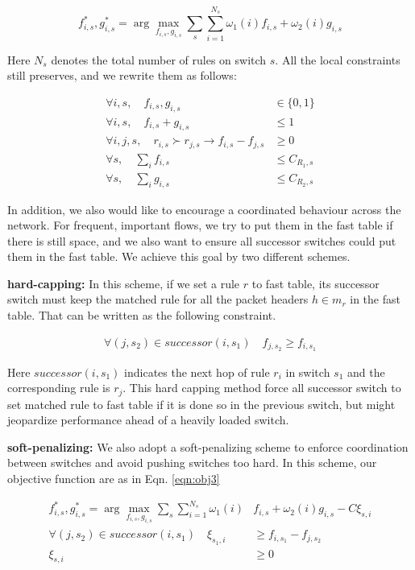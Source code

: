 \documentclass[10pt,twocolumn,letterpaper]{article}
\begin{document}
\begin{equation}
f_{i,s}^*,g_{i,s}^*=\arg\max_{f_{i,s},g_{i,s}} \sum_{s}\sum_{i=1}^{N_s} \omega_1(i)f_{i,s} + \omega_2(i)g_{i,s} \label{eqn:obj2}
\end{equation}

Here $N_s$ denotes the total number of rules on switch $s$. All the local constraints still preserves, and we rewrite them as follows:

\begin{align}
\label{eqn:con1b}\forall i,s, \quad f_{i,s}, g_{i,s} &\in \{0,1\} \\
\label{eqn:con2b}\forall i,s, \quad  f_{i,s}+g_{i,s} &\leq 1 \\
\label{eqn:con3b}\forall i,j,s, \quad  r_{i,s} \succ r_{j,s} \to f_{i,s}-f_{j,s} &\geq 0 \\
\label{eqn:con4b}\forall s, \quad  \sum_i f_{i,s} &\leq C_{R_1,s} \\
\label{eqn:con5b}\forall s, \quad  \sum_i g_{i,s} &\leq C_{R_2,s}
\end{align}

In addition, we also would like to encourage a coordinated behaviour across the network. For frequent, important flows, we try to put them in the fast table if there is still space, and we also want to ensure all successor switches could put them in the fast table. We achieve this goal by two different schemes.

\textbf{hard-capping:} In this scheme, if we set a rule $r$ to fast table, its successor switch must keep the matched rule for all the packet headers $h \in m_r$ in the fast table. That can be written as the following constraint.

\begin{align}
\forall (j,s_2) \in successor(i,s_1) \quad f_{j,s_2} \geq f_{i,s_1}
\end{align}

Here $successor(i,s_1)$ indicates the next hop of rule $r_i$ in switch $s_1$ and the corresponding rule is $r_j$. This hard capping method force all successor switch to set matched rule to fast table if it is done so in the previous switch, but might jeopardize performance ahead of a heavily loaded switch.

\textbf{soft-penalizing:} We also adopt a soft-penalizing scheme to enforce coordination between switches and avoid pushing switches too hard. In this scheme, our objective function are as in Eqn. \ref{eqn:obj3}

\begin{align}
\label{eqn:obj3} f_{i,s}^*,g_{i,s}^*=\arg\max_{f_{i,s},g_{i,s}} \sum_{s}\sum_{i=1}^{N_s} \omega_1(i)&f_{i,s} + \omega_2(i)g_{i,s} -C \xi_{s,i}\\
\forall (j,s_2) \in successor(i,s_1) \quad \xi_{s_1,i} &\geq f_{i,s_1} - f_{j,s_2}\\
\xi_{s,i} &\geq 0
\end{align}
\end{document}
